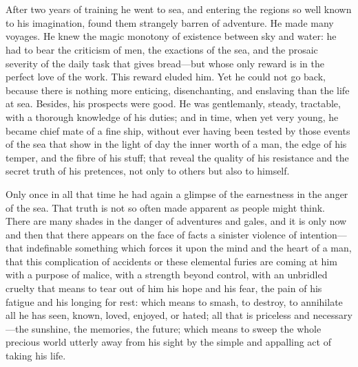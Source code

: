 \chapter{}
 After two years of training he went to sea, and entering the regions so well known to his imagination, found them strangely barren of adventure. He made many voyages. He knew the magic monotony of existence between sky and water: he had to bear the criticism of men, the exactions of the sea, and the prosaic severity of the daily task that gives bread—but whose only reward is in the perfect love of the work. This reward eluded him. Yet he could not go back, because there is nothing more enticing, disenchanting, and enslaving than the life at sea. Besides, his prospects were good. He was gentlemanly, steady, tractable, with a thorough knowledge of his duties; and in time, when yet very young, he became chief mate of a fine ship, without ever having been tested by those events of the sea that show in the light of day the inner worth of a man, the edge of his temper, and the fibre of his stuff; that reveal the quality of his resistance and the secret truth of his pretences, not only to others but also to himself.

Only once in all that time he had again a glimpse of the earnestness in the anger of the sea. That truth is not so often made apparent as people might think. There are many shades in the danger of adventures and gales, and it is only now and then that there appears on the face of facts a sinister violence of intention—that indefinable something which forces it upon the mind and the heart of a man, that this complication of accidents or these elemental furies are coming at him with a purpose of malice, with a strength beyond control, with an unbridled cruelty that means to tear out of him his hope and his fear, the pain of his fatigue and his longing for rest: which means to smash, to destroy, to annihilate all he has seen, known, loved, enjoyed, or hated; all that is priceless and necessary—the sunshine, the memories, the future; which means to sweep the whole precious world utterly away from his sight by the simple and appalling act of taking his life.

